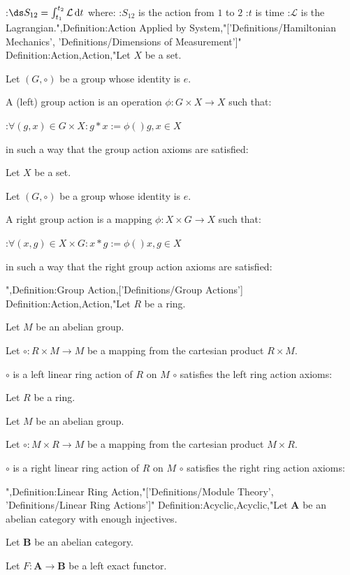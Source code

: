 :$\ds S_{12} = \int_{t_1}^{t_2} \mathcal L \,\mathrm d t$
where:
:$S_{12}$ is the action from $1$ to $2$
:$t$ is time
:$\mathcal L$ is the Lagrangian.",Definition:Action Applied by System,"['Definitions/Hamiltonian Mechanics', 'Definitions/Dimensions of Measurement']"
Definition:Action,Action,"Let $X$ be a set.

Let $\left( G, \circ \right)$ be a group whose identity is $e$.


A (left) group action is an operation $\phi: G \times X \to X$ such that:

:$\forall \left( g, x \right) \in G \times X: g * x := \phi \left(   \right){g, x} \in X$

in such a way that the group action axioms are satisfied:

Let $X$ be a set.

Let $\left( G, \circ \right)$ be a group whose identity is $e$.


A right group action is a mapping $\phi: X \times G \to X$ such that:

:$\forall \left( x, g \right) \in X \times G : x * g := \phi \left(   \right){x, g} \in X$

in such a way that the right group action axioms are satisfied:

",Definition:Group Action,['Definitions/Group Actions']
Definition:Action,Action,"Let $R$ be a ring.

Let $M$ be an abelian group.

Let $\circ : R \times M \to M$ be a mapping from the cartesian product $R \times M$.


$\circ$ is a left linear ring action of $R$ on $M$  $\circ$ satisfies the left ring action axioms:

Let $R$ be a ring.

Let $M$ be an abelian group.

Let $\circ : M \times R \to M$ be a mapping from the cartesian product $M \times R$.


$\circ$ is a right linear ring action of $R$ on $M$  $\circ$ satisfies the right ring action axioms:

",Definition:Linear Ring Action,"['Definitions/Module Theory', 'Definitions/Linear Ring Actions']"
Definition:Acyclic,Acyclic,"Let $\mathbf A$ be an abelian category with enough injectives.

Let $\mathbf B$ be an abelian category.

Let $F : \mathbf A \to \mathbf B$ be a left exact functor.

